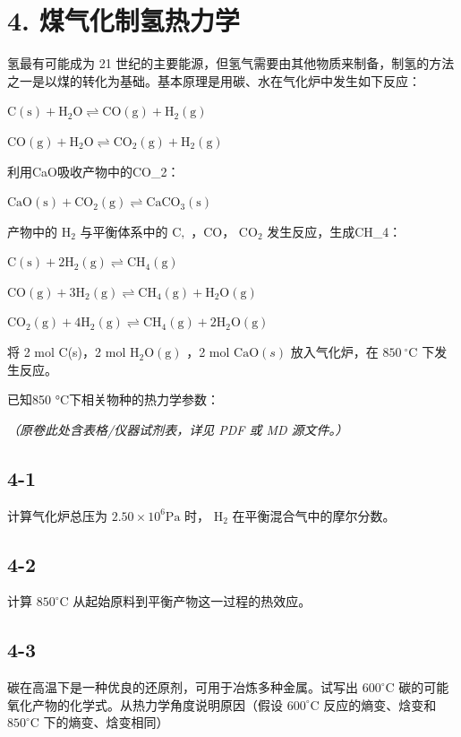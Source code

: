 \section*{4. 煤气化制氢热力学}
氢最有可能成为 21 世纪的主要能源，但氢⽓需要由其他物质来制备，制氢的⽅法之⼀是以煤的转化为基础。基本原理是⽤碳、⽔在⽓化炉中发⽣如下反应：

$
\mathrm{C} (\mathrm{s}) + \mathrm{H} _ {2} \mathrm{O} \rightleftharpoons \mathrm{CO} (\mathrm{g}) + \mathrm{H} _ {2} (\mathrm{g})\tag{1}
$

$
\mathrm{CO} (\mathrm{g}) + \mathrm{H} _ {2} \mathrm{O} \rightleftharpoons \mathrm{CO} _ {2} (\mathrm{g}) + \mathrm{H} _ {2} (\mathrm{g})\tag{2}
$

利⽤CaO吸收产物中的CO_{2}：

$
\mathrm{CaO} (\mathrm{s}) + \mathrm{CO} _ {2} (\mathrm{g}) \rightleftharpoons \mathrm{CaCO} _ {3} (\mathrm{s})\tag{3}
$

产物中的 $\mathrm { H } _ { 2 }$ 与平衡体系中的 $\mathrm { C } ,$ ，CO， $\mathrm { C O _ { 2 } }$ 发⽣反应，⽣成CH_{4}：

$
\mathrm{C} (\mathrm{s}) + 2 \mathrm{H} _ {2} (\mathrm{g}) \rightleftharpoons \mathrm{CH} _ {4} (\mathrm{g})\tag{4}
$

$
\mathrm{CO} (\mathrm{g}) + 3 \mathrm{H} _ {2} (\mathrm{g}) \rightleftharpoons \mathrm{CH} _ {4} (\mathrm{g}) + \mathrm{H} _ {2} \mathrm{O} (\mathrm{g})\tag{5}
$

$
\mathrm{CO} _ {2} (\mathrm{g}) + 4 \mathrm{H} _ {2} (\mathrm{g}) \rightleftharpoons \mathrm{CH} _ {4} (\mathrm{g}) + 2 \mathrm{H} _ {2} \mathrm{O} (\mathrm{g})\tag{6}
$

将 2 mol C(s)，2 mol $\mathrm { H _ { 2 } O ( g ) }$ ，2 mol $\mathrm { C a O } ( s )$ 放⼊⽓化炉，在 $8 5 0 ~ ^ { \circ } \mathrm { C }$ 下发⽣反应。

已知850 °C下相关物种的热⼒学参数：

\textit{（原卷此处含表格/仪器试剂表，详见 PDF 或 MD 源文件。）}

\subsection*{4-1}
计算⽓化炉总压为 $2 . 5 0 \times 1 0 ^ { 6 } \mathrm { P a }$ 时， $\mathrm { H } _ { 2 }$ 在平衡混合⽓中的摩尔分数。

\subsection*{4-2}
计算 $8 5 0 ^ { \circ } \mathrm { C }$ 从起始原料到平衡产物这⼀过程的热效应。

\subsection*{4-3}
碳在⾼温下是⼀种优良的还原剂，可⽤于冶炼多种⾦属。试写出 $6 0 0 ^ { \circ } \mathrm { C }$ 碳的可能氧化产物的化学式。从热⼒学⻆度说明原因（假设 $6 0 0 ^ { \circ } \mathrm { C }$ 反应的熵变、焓变和 $8 5 0 ^ { \circ } \mathrm { C }$ 下的熵变、焓变相同）
